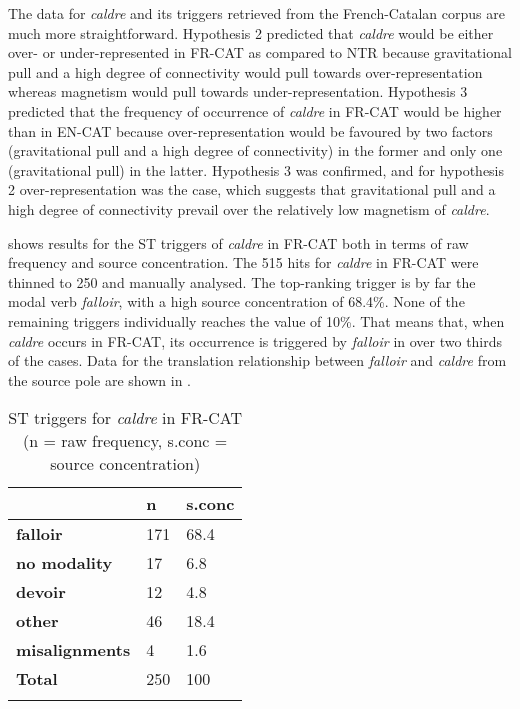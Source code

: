 \documentclass[output=paper,english,spanish,german,english]{langsci/langscibook}
\begin{document}
The data for \textit{caldre} and its triggers retrieved from the French-Catalan corpus are much more straightforward. Hypothesis 2 predicted that \textit{caldre} would be either over- or under-represented in FR-CAT as compared to NTR because gravitational pull and a high degree of connectivity would pull towards over-rep\-resentation whereas magnetism would pull towards under-representation. Hypothesis 3 predicted that the frequency of occurrence of \textit{caldre} in FR-CAT would be higher than in EN-CAT because over-representation would be favoured by two factors (gravitational pull and a high degree of connectivity) in the former and only one (gravitational pull) in the latter. Hypothesis 3 was confirmed, and for hypothesis 2 over-representation was the case, which suggests that gravitational pull and a high degree of connectivity prevail over the relatively low magnetism of \textit{caldre}.

 shows results for the ST triggers of \textit{caldre} in FR-CAT both in terms of raw frequency and source concentration. The 515 hits for \textit{caldre} in FR-CAT were thinned to 250 and manually analysed. The top-ranking trigger is by far the modal verb \textit{falloir}, with a high source concentration of 68.4\%. None of the remaining triggers individually reaches the value of 10\%. That means that, when \textit{caldre} occurs in FR-CAT, its occurrence is triggered by \textit{falloir} in over two thirds of the cases. Data for the translation relationship between \textit{falloir} and \textit{caldre} from the source pole are shown in .

\begin{table}[b]
\caption{ST triggers for \textit{caldre} in FR-CAT (n = raw frequency, s.conc = source concentration)}\label{cal-trig}
  \begin{tabularx}{\textwidth}{lYY}
    \lsptoprule
    & {\bfseries n} & {\bfseries s.conc}\\
    \midrule
    {\bfseries falloir}       & 171 & 68.4\\
    {\bfseries no modality}   & 17  & 6.8\\
    {\bfseries devoir}        & 12  & 4.8\\
    {\bfseries other}         & 46  & 18.4\\
    {\bfseries misalignments} & 4   & 1.6\\
    \midrule
    {\bfseries Total}         & 250 & 100\\
    \lspbottomrule
  \end{tabularx}
\end{table}
\end{document}
